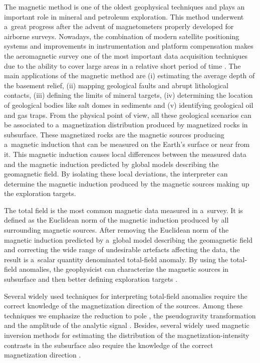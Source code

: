 \documentclass[journal abbreviation, npg]{copernicus}
\providecommand{\DIFdelbegin}{} %
\providecommand{\DIFdelend}{} %
\begin{document}
\introduction The magnetic method is one of the oldest geophysical techniques
and plays an important role in mineral and petroleum exploration. This method
underwent a~great progress after the advent of magnetometers properly
developed for airborne surveys. Nowadays, the combination of modern satellite
positioning systems and improvements in instrumentation and platform
compensation makes the aeromagnetic survey one of the most important 
data acquisition techniques due to the ability to cover large areas in a 
relative short period of time \citep{blakely1996,nabighian-etal2005}. 
The main applications
of the magnetic method are (i) estimating the average depth of the basement
relief, (ii) mapping geological faults and abrupt lithological contacts,
(iii) defining the limits of mineral targets, (iv) determining the location
of geological bodies like salt domes in sediments and (v) identifying
geological oil and gas traps. From the physical point of view, all these
geological scenarios can be associated to a~magnetization distribution
produced by magnetized rocks in subsurface. These magnetized rocks are the
magnetic sources producing a~magnetic induction that can be measured on the
Earth's surface or near from it. This magnetic induction causes local
differences between the measured data and the magnetic induction predicted by
global models describing the geomagnetic field. By isolating these local
deviations, the interpreter can determine the magnetic induction produced by
the magnetic sources making up the exploration targets.

The total field is the most common magnetic data measured in a~survey. It is
defined as the Euclidean norm of the magnetic induction produced by all
surrounding magnetic sources. After removing the Euclidean norm of the
magnetic induction predicted by a~global model describing the geomagnetic
field and correcting the wide range of undesirable artefacts affecting the
data, the result is a~scalar quantity denominated total-field anomaly. By 
using the total-field
anomalies, the geophysicist can characterize the magnetic sources in
subsurface and then better defining exploration targets
\citep{telford-etal1990,blakely1996}. \DIFdelbegin %

\DIFdelend Several widely used techniques 
for interpreting total-field 
anomalies require the correct knowledge of the magnetization 
direction of the sources. Among these techniques we emphasize 
the reduction to pole \citep{baranov1957,baranov-naudy1964,silva1986}, 
the pseudogravity transformation \citep{baranov1957} and the amplitude 
of the analytic signal \citep{nabighian1972,nabighian1974, 
nabighian1984,li2006}. Besides, several widely used magnetic inversion 
methods for estimating the distribution of the magnetization-intensity 
contrasts in the subsurface also require the knowledge of the correct 
magnetization direction \citep{li-oldenburg1996, pilkington1997,
portniaguine-zhdanov1999, portniaguine-zhdanov2002, barbosa-silva2006}.
\DIFdelbegin %
\end{document}
